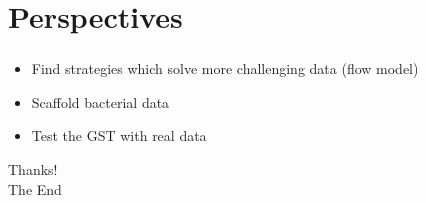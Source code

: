 \documentclass{beamer}
\begin{document}
\section{Perspectives}\label{17}
\begin{frame}
\frametitle{\textsc{}}
\begin{itemize}
\item Find strategies which solve more challenging data (flow model)
\item Scaffold bacterial data
\item Test the GST with real data
\end{itemize}
\end{frame}

\begin{frame}
\Huge{{ Thanks! \\ \vspace*{2cm} The End}}
\end{frame}
\end{document}
